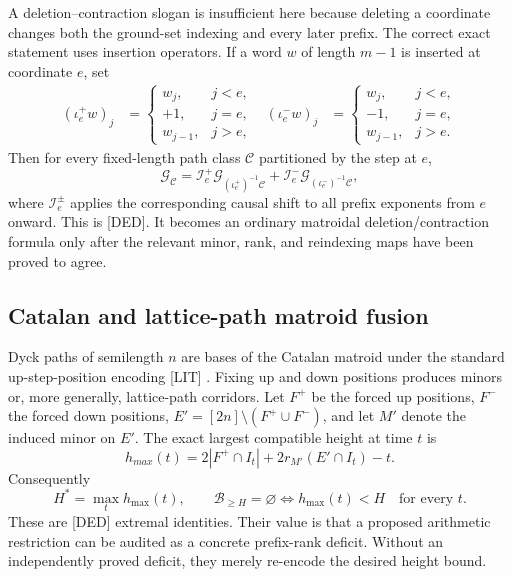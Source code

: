 \documentclass[11pt]{amsart}
\numberwithin{equation}{section}
\theoremstyle{plain}
\theoremstyle{definition}
\theoremstyle{remark}
\begin{document}
A deletion--contraction slogan is insufficient here because deleting a
coordinate changes both the ground-set indexing and every later prefix.  The
correct exact statement uses insertion operators.  If a word $w$ of length
$m-1$ is inserted at coordinate $e$, set
\begin{align}
(\iota_e^+w)_j&=
\begin{cases}w_j,&j<e,\\+1,&j=e,\\w_{j-1},&j>e,\end{cases}
&
(\iota_e^-w)_j&=
\begin{cases}w_j,&j<e,\\-1,&j=e,\\w_{j-1},&j>e.\end{cases}
\label{eq:v9_insertion_maps}
\end{align}
Then for every fixed-length path class $\mathcal C$ partitioned by the step at
$e$,
\begin{equation}
\mathcal G_{\mathcal C}
=\mathscr I_e^+\mathcal G_{(\iota_e^+)^{-1}\mathcal C}
+\mathscr I_e^-\mathcal G_{(\iota_e^-)^{-1}\mathcal C},
\label{eq:v9_insertion_identity}
\end{equation}
where $\mathscr I_e^{\pm}$ applies the corresponding causal shift to all
prefix exponents from $e$ onward.  This is \textup{[DED]}.  It becomes an
ordinary matroidal deletion/contraction formula only after the relevant minor,
rank, and reindexing maps have been proved to agree.

\subsection{Catalan and lattice-path matroid fusion}

Dyck paths of semilength $n$ are bases of the Catalan matroid under the standard
up-step-position encoding \textup{[LIT]} \cite{ArdilaCatalanMatroid,
BoninDeMierNoy}.  Fixing up and down positions produces minors or, more
generally, lattice-path corridors.  Let $F^+$ be the forced up positions,
$F^-$ the forced down positions, $E'=[2n]\setminus(F^+\cup F^-)$, and let
$M'$ denote the induced minor on $E'$.  The exact largest compatible height at
time $t$ is
\begin{equation}
\boxed{
h_{max}(t)=2|F^+\cap I_t|
+2r_{M'}(E'\cap I_t)-t.}
\label{eq:v9_rank_height_fixed}
\end{equation}
Consequently
\begin{equation}
H^*=\max_t h_{\max}(t),
\qquad
\mathcal B_{\ge H}=\varnothing
\iff h_{\max}(t)<H\quad\text{for every }t.
\label{eq:v9_high_sector_rank}
\end{equation}
These are \textup{[DED]} extremal identities.  Their value is that a proposed
arithmetic restriction can be audited as a concrete prefix-rank deficit.
Without an independently proved deficit, they merely re-encode the desired
height bound.
\end{document}
